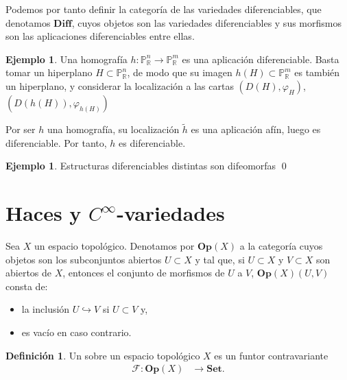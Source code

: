 \documentclass[12pt,a4paper]{book}
\theoremstyle{definition} \newtheorem{defn}[thm]{Definición}
\theoremstyle{definition} \newtheorem{ejemplo}[thm]{Ejemplo}
\theoremstyle{definition} \newtheorem{ejercicio}[thm]{Ejercicio}
\theoremstyle{remark} \newtheorem*{obs}{Observación}
\def\RR{\mathbb{R}}
\def\PP{\mathbb{P}}
\let\emph\relax
\begin{document}
       Podemos por tanto definir la categoría de las variedades diferenciables, que denotamos $\mathbf{Diff}$, cuyos objetos son las variedades diferenciables y sus morfismos son las aplicaciones diferenciables entre ellas.

       \begin{ejemplo}
	 Una homografía $h:\PP^n_\RR \rightarrow \PP^m_\RR$ es una aplicación diferenciable. Basta tomar un hiperplano $H \subset \PP^n_\RR$, de modo que su imagen $h(H)\subset \PP^m_\RR$ es también un hiperplano, y considerar la localización a las cartas $(D(H),\varphi_H)$, $(D(h(H)),\varphi_{h(H)})$
      \begin{center}
       \end{center}
       Por ser $h$ una homografía, su localización $\tilde{h}$ es una aplicación afín, luego es diferenciable. Por tanto, $h$ es diferenciable.
       \end{ejemplo}

    \begin{ejemplo}
      Estructuras diferenciables distintas son difeomorfas
      \qed
    \end{ejemplo}
    \section{Haces y $C^\infty$-variedades}

    Sea $X$ un espacio topológico. Denotamos por $\mathbf{Op}(X)$ a la categoría cuyos objetos son los subconjuntos abiertos $U\subset X$ y tal que, si $U\subset X$ y $V\subset X$ son abiertos de $X$, entonces el conjunto de morfismos de $U$ a $V$, $\mathbf{Op}(X) (U,V)$ consta de:
    \begin{itemize}
      \item la inclusión $U\hookrightarrow V$ si $U\subset V$ y,
      \item es vacío en caso contrario.
    \end{itemize}

    \begin{defn}
      Un \emph{prehaz} sobre un espacio topológico $X$ es un funtor contravariante
      \begin{align*}
	\mathscr{F} :\mathbf{Op}(X)&\longrightarrow \mathbf{Set}.
	\end{align*}
    \end{defn}
\end{document}
